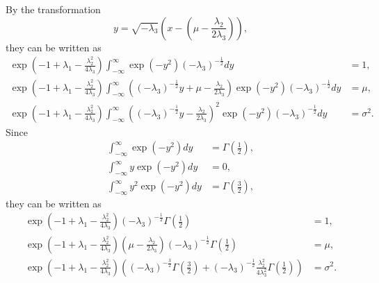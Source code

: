 %
By the transformation
%
\begin{equation}
y 
= 
\sqrt{- \lambda_3} 
\left( 
	x 
	- 
	\left( 
		\mu 
		- 
		\frac{\lambda_2}{2 \lambda_3} 
	\right) 
\right),
\end{equation}
%
they can be written as
%
\begin{equation}
\begin{aligned}
\exp 
\left( 
	- 
	1 
	+ 
	\lambda_1 
	- 
	\frac{\lambda_2 ^ 2}{4 \lambda_3} 
\right) 
\int_{- \infty}^{\infty} 
\exp 
\left( 
	- 
	y ^ 2 
\right) 
(- \lambda_3) ^ {- \frac{1}{2}} 
dy 
&= 
1,\\
\exp 
\left( 
	- 
	1 
	+ 
	\lambda_1 
	- 
	\frac{\lambda_2 ^ 2}{4 \lambda_3} 
\right) 
\int_{- \infty}^{\infty} 
\left( 
	(- \lambda_3) ^ {- \frac{1}{2}} 
	y 
	+ 
	\mu 
	- 
	\frac{\lambda_2}{2 \lambda_3} 
\right) 
\exp 
\left( 
	- 
	y ^ 2 
\right) 
(- \lambda_3) ^ {- \frac{1}{2}} 
dy 
&= 
\mu,\\
\exp 
\left( 
	- 
	1 
	+ 
	\lambda_1 
	- 
	\frac{\lambda_2 ^ 2}{4 \lambda_3} 
\right) 
\int_{- \infty}^{\infty} 
\left( 
	(- \lambda_3) ^ {- \frac{1}{2}} 
	y 
	- 
	\frac{\lambda_2}{2 \lambda_3} 
\right) ^ 2 
\exp 
\left( 
	- 
	y ^ 2 
\right) 
(- \lambda_3) ^ {- \frac{1}{2}} 
dy 
&= 
\sigma ^ 2.
\end{aligned}
\end{equation}
%
Since
%
\begin{equation}
\begin{aligned}
\int_{- \infty}^{\infty} 
\exp 
\left( 
	- 
	y ^ 2 
\right) 
dy 
&= 
\Gamma 
\left( 
	\frac{1}{2} 
\right), \\
\int_{- \infty}^{\infty} 
y 
\exp 
\left( 
	- 
	y ^ 2 
\right) 
dy 
&= 
0, \\
\int_{- \infty}^{\infty} 
y ^ 2 
\exp 
\left( 
	- 
	y ^ 2 
\right) 
dy 
&= 
\Gamma 
\left( 
	\frac{3}{2} 
\right),
\end{aligned}
\end{equation}
%
they can be written as
%
\begin{equation}
\begin{aligned}
\exp 
\left( 
	- 
	1 
	+ 
	\lambda_1 
	- 
	\frac{\lambda_2 ^ 2}{4 \lambda_3} 
\right) 
(- \lambda_3) ^ {- \frac{1}{2}} 
\Gamma 
\left( 
	\frac{1}{2} 
\right) 
&= 
1, \\
\exp 
\left( 
	- 
	1 
	+ 
	\lambda_1 
	- 
	\frac{\lambda_2 ^ 2}{4 \lambda_3} 
\right) 
\left( 
	\mu 
	- 
	\frac{\lambda_2}{2 \lambda_3} 
\right) 
(- \lambda_3) ^ {- \frac{1}{2}} 
\Gamma 
\left( 
	\frac{1}{2} 
\right) &= 
\mu, \\
\exp 
\left( 
	- 
	1 
	+ 
	\lambda_1 
	- 
	\frac{\lambda_2 ^ 2}{4 \lambda_3} 
\right) 
\left( 
	(- \lambda_3) ^ {- \frac{3}{2}} 
	\Gamma 
	\left( 
		\frac{3}{2} 
	\right) 
	+ 
	(- \lambda_3) ^ {- \frac{1}{2}} 
	\frac{\lambda_2 ^ 2}{4 \lambda_3 ^ 2} 
	\Gamma 	
	\left( 
		\frac{1}{2} 
	\right) 
\right) 
&= 
\sigma ^ 2.
\end{aligned}
\end{equation}
